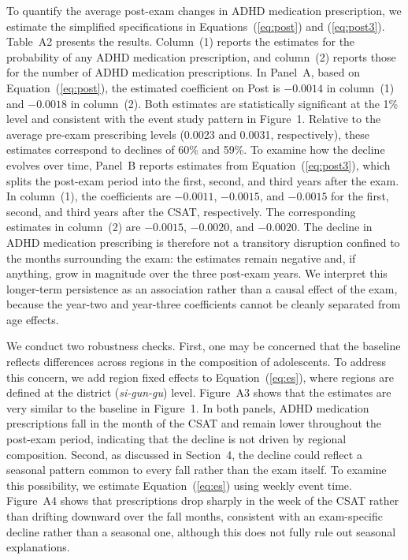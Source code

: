 \documentclass[12pt]{article}
\begin{document}
To quantify the average post-exam changes in ADHD medication prescription, we estimate the simplified specifications in Equations~(\ref{eq:post}) and (\ref{eq:post3}). Table~A2 presents the results. Column~(1) reports the estimates for the probability of any ADHD medication prescription, and column~(2) reports those for the number of ADHD medication prescriptions. In Panel~A, based on Equation~(\ref{eq:post}), the estimated coefficient on Post is $-0.0014$ in column~(1) and $-0.0018$ in column~(2). Both estimates are statistically significant at the 1\% level and consistent with the event study pattern in Figure~1. Relative to the average pre-exam prescribing levels (0.0023 and 0.0031, respectively), these estimates correspond to declines of 60\% and 59\%. To examine how the decline evolves over time, Panel~B reports estimates from Equation~(\ref{eq:post3}), which splits the post-exam period into the first, second, and third years after the exam. In column~(1), the coefficients are $-0.0011$, $-0.0015$, and $-0.0015$ for the first, second, and third years after the CSAT, respectively. The corresponding estimates in column~(2) are $-0.0015$, $-0.0020$, and $-0.0020$. The decline in ADHD medication prescribing is therefore not a transitory disruption confined to the months surrounding the exam: the estimates remain negative and, if anything, grow in magnitude over the three post-exam years. We interpret this longer-term persistence as an association rather than a causal effect of the exam, because the year-two and year-three coefficients cannot be cleanly separated from age effects.

We conduct two robustness checks. First, one may be concerned that the baseline reflects differences across regions in the composition of adolescents. To address this concern, we add region fixed effects to Equation~(\ref{eq:es}), where regions are defined at the district (\textit{si-gun-gu}) level. Figure~A3 shows that the estimates are very similar to the baseline in Figure~1. In both panels, ADHD medication prescriptions fall in the month of the CSAT and remain lower throughout the post-exam period, indicating that the decline is not driven by regional composition. Second, as discussed in Section~4, the decline could reflect a seasonal pattern common to every fall rather than the exam itself. To examine this possibility, we estimate Equation~(\ref{eq:es}) using weekly event time. Figure~A4 shows that prescriptions drop sharply in the week of the CSAT rather than drifting downward over the fall months, consistent with an exam-specific decline rather than a seasonal one, although this does not fully rule out seasonal explanations.
\end{document}

